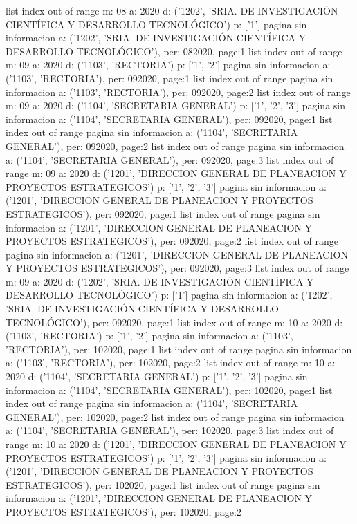 \documentclass[11pt]{article}
\begin{document}
list index out of range
m: 08 a: 2020 d: ('1202', 'SRIA. DE INVESTIGACIÓN CIENTÍFICA Y DESARROLLO TECNOLÓGICO') p: ['1']
pagina sin informacion a: ('1202', 'SRIA. DE INVESTIGACIÓN CIENTÍFICA Y DESARROLLO TECNOLÓGICO'), per: 082020, page:1
list index out of range
m: 09 a: 2020 d: ('1103', 'RECTORIA') p: ['1', '2']
pagina sin informacion a: ('1103', 'RECTORIA'), per: 092020, page:1
list index out of range
pagina sin informacion a: ('1103', 'RECTORIA'), per: 092020, page:2
list index out of range
m: 09 a: 2020 d: ('1104', 'SECRETARIA GENERAL') p: ['1', '2', '3']
pagina sin informacion a: ('1104', 'SECRETARIA GENERAL'), per: 092020, page:1
list index out of range
pagina sin informacion a: ('1104', 'SECRETARIA GENERAL'), per: 092020, page:2
list index out of range
pagina sin informacion a: ('1104', 'SECRETARIA GENERAL'), per: 092020, page:3
list index out of range
m: 09 a: 2020 d: ('1201', 'DIRECCION GENERAL DE PLANEACION Y PROYECTOS ESTRATEGICOS') p: ['1', '2', '3']
pagina sin informacion a: ('1201', 'DIRECCION GENERAL DE PLANEACION Y PROYECTOS ESTRATEGICOS'), per: 092020, page:1
list index out of range
pagina sin informacion a: ('1201', 'DIRECCION GENERAL DE PLANEACION Y PROYECTOS ESTRATEGICOS'), per: 092020, page:2
list index out of range
pagina sin informacion a: ('1201', 'DIRECCION GENERAL DE PLANEACION Y PROYECTOS ESTRATEGICOS'), per: 092020, page:3
list index out of range
m: 09 a: 2020 d: ('1202', 'SRIA. DE INVESTIGACIÓN CIENTÍFICA Y DESARROLLO TECNOLÓGICO') p: ['1']
pagina sin informacion a: ('1202', 'SRIA. DE INVESTIGACIÓN CIENTÍFICA Y DESARROLLO TECNOLÓGICO'), per: 092020, page:1
list index out of range
m: 10 a: 2020 d: ('1103', 'RECTORIA') p: ['1', '2']
pagina sin informacion a: ('1103', 'RECTORIA'), per: 102020, page:1
list index out of range
pagina sin informacion a: ('1103', 'RECTORIA'), per: 102020, page:2
list index out of range
m: 10 a: 2020 d: ('1104', 'SECRETARIA GENERAL') p: ['1', '2', '3']
pagina sin informacion a: ('1104', 'SECRETARIA GENERAL'), per: 102020, page:1
list index out of range
pagina sin informacion a: ('1104', 'SECRETARIA GENERAL'), per: 102020, page:2
list index out of range
pagina sin informacion a: ('1104', 'SECRETARIA GENERAL'), per: 102020, page:3
list index out of range
m: 10 a: 2020 d: ('1201', 'DIRECCION GENERAL DE PLANEACION Y PROYECTOS ESTRATEGICOS') p: ['1', '2', '3']
pagina sin informacion a: ('1201', 'DIRECCION GENERAL DE PLANEACION Y PROYECTOS ESTRATEGICOS'), per: 102020, page:1
list index out of range
pagina sin informacion a: ('1201', 'DIRECCION GENERAL DE PLANEACION Y PROYECTOS ESTRATEGICOS'), per: 102020, page:2
\end{document}
